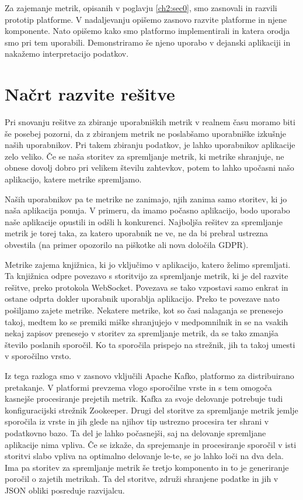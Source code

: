 \documentclass[a4paper, 12pt]{book}
\begin{document}
Za zajemanje metrik, opisanih v poglavju \ref{ch2:sec0}, smo zasnovali in razvili prototip platforme. V nadaljevanju opišemo zasnovo razvite platforme in njene komponente. Nato opišemo kako smo platformo implementirali in katera orodja smo pri tem uporabili. Demonstriramo še njeno uporabo v dejanski aplikaciji in nakažemo interpretacijo podatkov.

\section{Načrt razvite rešitve}
\label{ch3:sec1}

Pri snovanju rešitve za zbiranje uporabniških metrik v realnem času moramo biti še posebej pozorni, da z zbiranjem metrik ne poslabšamo uporabniške izkušnje naših uporabnikov. Pri takem zbiranju podatkov, je lahko uporabnikov aplikacije zelo veliko. Če se naša storitev za spremljanje metrik, ki metrike shranjuje, ne obnese dovolj dobro pri velikem številu zahtevkov, potem to lahko upočasni našo aplikacijo, katere metrike spremljamo.

Naših uporabnikov pa te metrike ne zanimajo, njih zanima samo storitev, ki jo naša aplikacija ponuja. V primeru, da imamo počasno aplikacijo, bodo uporabo naše aplikacije opustili in odšli h konkurenci. Najboljša rešitev za spremljanje metrik je torej taka, za katero uporabnik ne ve, ne da bi prebral ustrezna obvestila (na primer opozorilo na piškotke ali nova določila GDPR).

Metrike zajema knjižnica, ki jo vključimo v aplikacijo, katero želimo spremljati. Ta knjižnica odpre povezavo s storitvijo za spremljanje metrik, ki je del razvite rešitve, preko protokola WebSocket. Povezava se tako vzpostavi samo enkrat in ostane odprta dokler uporabnik uporablja aplikacijo. Preko te povezave nato pošiljamo zajete metrike. Nekatere metrike, kot so časi nalaganja se prenesejo takoj, medtem ko se premiki miške shranjujejo v medpomnilnik in se na vsakih nekaj zapisov prenesejo v storitev za spremljanje metrik, da se tako zmanjša število poslanih sporočil. Ko ta sporočila prispejo na strežnik, jih ta takoj umesti v sporočilno vrsto.

Iz tega razloga smo v zasnovo vključili Apache Kafko, platformo za distribuirano pretakanje. V platformi prevzema vlogo sporočilne vrste in s tem omogoča kasnejše procesiranje prejetih metrik. Kafka za svoje delovanje potrebuje tudi konfiguracijski strežnik Zookeeper. Drugi del storitve za spremljanje metrik jemlje sporočila iz vrste in jih glede na njihov tip ustrezno procesira ter shrani v podatkovno bazo. Ta del je lahko počasnejši, saj na delovanje spremljane aplikacije nima vpliva. Če se izkaže, da sprejemanje in procesiranje sporočil v isti storitvi slabo vpliva na optimalno delovanje le-te, se jo lahko loči na dva dela. Ima pa storitev za spremljanje metrik še tretjo komponento in to je generiranje poročil o zajetih metrikah. Ta del storitve, združi shranjene podatke in jih v JSON obliki posreduje razvijalcu.
\end{document}
